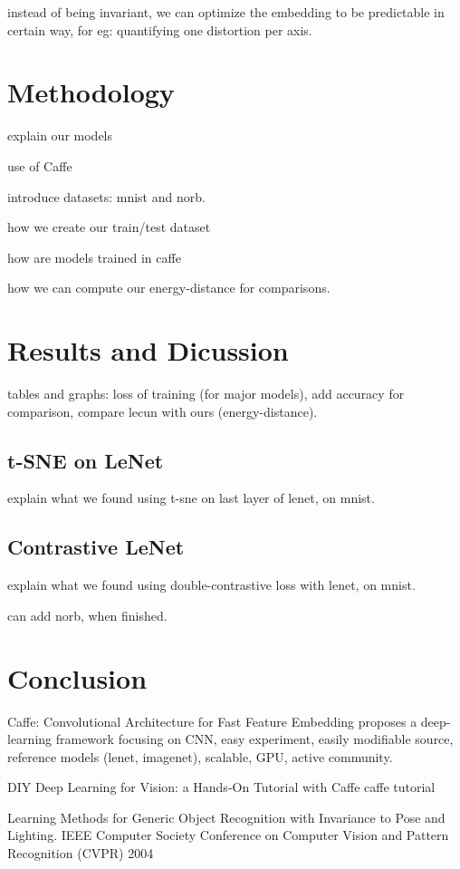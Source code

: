 \documentclass[a4paper,12pt]{report}
\begin{document}
instead of being invariant, we can optimize the embedding to be predictable in certain way, for eg: quantifying one distortion per axis.

\chapter{Methodology}

explain our models

use of Caffe

introduce datasets: mnist and norb.

how we create our train/test dataset

how are models trained in caffe

how we can compute our energy-distance for comparisons.

\chapter{Results and Dicussion}

tables and graphs: loss of training (for major models), add accuracy for comparison, compare lecun with ours (energy-distance).

\section{t-SNE on LeNet}
explain what we found using t-sne on last layer of lenet, on mnist.

\section{Contrastive LeNet}
explain what we found using double-contrastive loss with lenet, on mnist.

can add norb, when finished.

\chapter{Conclusion}


Caffe: Convolutional Architecture for Fast Feature Embedding
proposes a deep-learning framework focusing on CNN, easy experiment, easily modifiable source, reference models (lenet, imagenet), scalable, GPU, active community.

DIY Deep Learning for Vision: a Hands-On Tutorial with Caffe
caffe tutorial

Learning Methods for Generic Object Recognition with Invariance to Pose and Lighting. IEEE Computer Society Conference on Computer Vision and Pattern Recognition (CVPR) 2004
\end{document}
